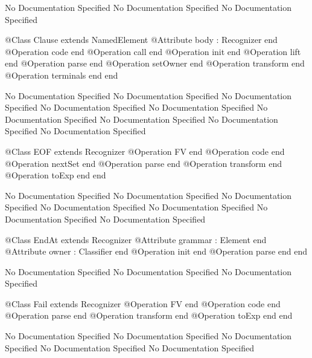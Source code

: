 No Documentation Specified
No Documentation Specified
No Documentation Specified
\begin{Interface}
@Class Clause extends NamedElement
  @Attribute body : Recognizer end
  @Operation code end
  @Operation call end
  @Operation init end
  @Operation lift end
  @Operation parse end
  @Operation setOwner end
  @Operation transform end
  @Operation terminals end
end
\end{Interface}
No Documentation Specified
No Documentation Specified
No Documentation Specified
No Documentation Specified
No Documentation Specified
No Documentation Specified
No Documentation Specified
No Documentation Specified
No Documentation Specified
\begin{Interface}
@Class EOF extends Recognizer
  @Operation FV end
  @Operation code end
  @Operation nextSet end
  @Operation parse end
  @Operation transform end
  @Operation toExp end
end
\end{Interface}
No Documentation Specified
No Documentation Specified
No Documentation Specified
No Documentation Specified
No Documentation Specified
No Documentation Specified
No Documentation Specified
\begin{Interface}
@Class EndAt extends Recognizer
  @Attribute grammar : Element end
  @Attribute owner : Classifier end
  @Operation init end
  @Operation parse end
end
\end{Interface}
No Documentation Specified
No Documentation Specified
No Documentation Specified
\begin{Interface}
@Class Fail extends Recognizer
  @Operation FV end
  @Operation code end
  @Operation parse end
  @Operation transform end
  @Operation toExp end
end
\end{Interface}
No Documentation Specified
No Documentation Specified
No Documentation Specified
No Documentation Specified
No Documentation Specified


